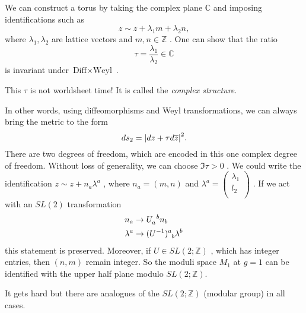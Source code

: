 \begin{example}[$g = 1$ (torus)]
  We can construct a torus by taking the complex plane $\mathbb{C}$  and imposing identifications such as
  \begin{equation}
    z \sim z + \lambda_1 m + \lambda_2 n,
  \end{equation}
  where $\lambda_1, \lambda_2$  are lattice vectors and $m, n \in \mathbb{Z}$ .
  One can show that the ratio
  \begin{equation}
    \tau = \frac{\lambda_1}{\lambda_2} \in \mathbb{C}
  \end{equation}
  is invariant under  $\text{Diff} \times \text{Weyl}$ .
  \begin{remark}
    This $\tau$ is not worldsheet time! It is called the \emph{complex structure}.
  \end{remark}
  In other words, using diffeomorphisms and Weyl transformations, we can always bring the metric to the form 
  \begin{equation}
    ds_2 = \abs{dz + \tau d \overline{z}{}}^2.
  \end{equation}
  There are two degrees of freedom, which are encoded in this one complex degree of freedom.
  Without loss of generality, we can choose $\Im \tau > 0$ . We could write the identification $z \sim z + n_a \lambda^a$ , where $n_a = (m, n)$  and $\lambda^a = 
  \begin{pmatrix}
  \lambda_1 \\
  l_2 \\
  \end{pmatrix} $ .
  If we act with an $SL(2)$  transformation
  \begin{align}
    n_a &\to U\indices{_{a}^{b}} n_{b} \\
    \lambda^{a} &\to (U^{-1})\indices{^{a}_{b}} \lambda^{b}
  \end{align}
  this statement is preserved.
  Moreover, if $U\in SL(2; \mathbb{Z})$ , which has integer entries, then $(n, m)$  remain integer.
  So the moduli space $M_1$ at $g=1$  can be identified with the upper half plane modulo $SL(2; \mathbb{Z})$.
  \begin{figure}[tbhp]
    \centering
    \def\svgwidth{0.5\columnwidth}
    
    \caption{}
    \label{fig:l8f1}
  \end{figure}
\end{example}
\begin{example}[$g \geq 2$]
  It gets hard but there are analogues of the $SL(2; \mathbb{Z})$ (modular group) in all cases.
\end{example}

